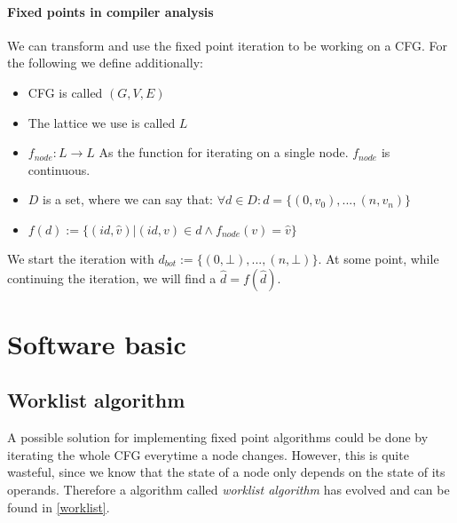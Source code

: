 \paragraph{Fixed points in compiler analysis}
We can transform and use the fixed point iteration to be working on a CFG. For the following we define additionally:
\begin{itemize}
	\item CFG is called $(G,V,E)$
	\item The lattice we use is called $L$
	\item $f _{node}:L \rightarrow L$ As the function for iterating on a single node. $f _{node}$ is continuous.
	\item $D$ is a set, where we can say that: $\forall d \in D: d = \{(0, v_0), ... , (n, v_n)\}$
	\item $f(d) := \{(id, \hat{v})| (id, v) \in d \wedge f _{node}(v) = \hat{v}\}$
\end{itemize}

We start the iteration with $d_{bot} := \{(0,\bot), ..., (n, \bot)\}$. At some point, while continuing the iteration, we will find a $\hat{d} = f(\hat{d})$. 


\section{Software basic}
\subsection{Worklist algorithm}

A possible solution for implementing fixed point algorithms could be done by iterating the whole CFG everytime a node changes. However, this is quite wasteful, since we know that the state of a node only depends on the state of its operands. Therefore a algorithm called \textit{worklist algorithm} has evolved and can be found in \autoref{worklist}.

